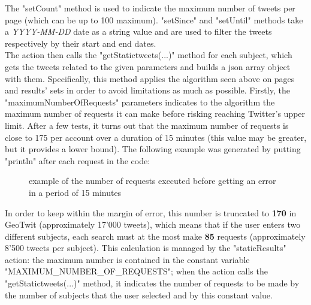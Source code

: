 \documentclass[a4paper,11pt]{report}
\begin{document}
The "setCount" method is used to indicate the maximum number of tweets per page (which can be up to 100 maximum). "setSince" and "setUntil" methods take a \emph{YYYY-MM-DD} date as a string value and are used to filter the tweets respectively by their start and end dates.\\

The action then calls the "getStatictweets(...)" method for each subject, which gets the tweets related to the given parameters and builds a json array object with them. Specifically, this method applies the algorithm seen above on pages and results' sets in order to avoid limitations as much as possible. Firstly, the "maximumNumberOfRequests" parameters indicates to the algorithm the maximum number of requests it can make before risking reaching Twitter's upper limit. After a few tests, it turns out that the maximum number of requests is close to 175 per account over a duration of 15 minutes (this value may be greater, but it provides a lower bound). The following example was generated by putting "println" after each request in the code:
\begin{figure}[H]
\vspace{-5pt}
\begin{center}
\vspace{-5pt}
\caption{example of the number of requests executed before getting an error in a period of 15 minutes}
\end{center}
\end{figure}
\newpage

In order to keep within the margin of error, this number is truncated to \textbf{170} in GeoTwit (approximately 17'000 tweets), which means that if the user enters two different subjects, each search must at the most make \textbf{85} requests (approximately 8'500 tweets per subject). This calculation is managed by the "staticResults" action: the maximum number is contained in the constant variable "MAXIMUM\_NUMBER\_OF\_REQUESTS"; when the action calls the "getStatictweets(...)" method, it indicates the number of requests to be made by the number of subjects that the user selected and by this constant value.\\
\end{document}
